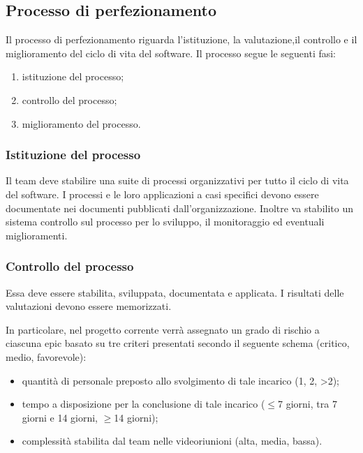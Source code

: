 \subsection{Processo di perfezionamento}
Il processo di perfezionamento riguarda l'istituzione, la valutazione,il controllo e il miglioramento del ciclo di vita del software. Il processo segue le seguenti fasi:

\begin{enumerate}
    \item istituzione del processo;
    \item controllo del processo;
    \item miglioramento del processo.
\end{enumerate}

\subsubsection{Istituzione del processo}
Il team deve stabilire una suite di processi organizzativi per tutto il ciclo di vita del software. I processi e le loro applicazioni a casi specifici devono essere documentate nei documenti pubblicati dall'organizzazione. Inoltre va stabilito un sistema controllo sul processo per lo sviluppo, il monitoraggio ed eventuali miglioramenti.

\subsubsection{Controllo del processo}

 Essa deve essere stabilita, sviluppata, documentata e applicata. I risultati delle valutazioni devono essere memorizzati.

In particolare, nel progetto corrente verrà assegnato un grado di rischio a ciascuna epic basato su tre criteri presentati secondo il seguente schema (critico, medio, favorevole):

\begin{itemize}
    \item quantità di personale preposto allo svolgimento di tale incarico (1, 2, >2);
    \item tempo a disposizione per la conclusione di tale incarico ($\leq$7 giorni, tra 7 giorni e 14 giorni, $\geq$14 giorni);
    \item complessità stabilita dal team nelle videoriunioni (alta, media, bassa).
\end{itemize}

